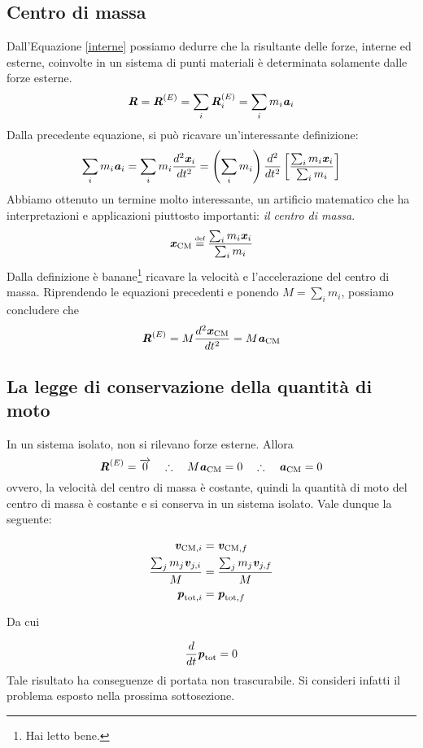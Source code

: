 \subsection{Centro di massa}
Dall'Equazione \ref{interne} possiamo dedurre che la risultante delle
forze, interne ed esterne, coinvolte in un sistema di punti materiali
è determinata solamente dalle forze esterne.
\[ \textbf{\textit{R}} = \textbf{\textit{R}}^{(E)} = \sum_{i} \textbf{\textit{R}}^{(E)}_i = \sum_i m_i\textbf{\textit{a}}_i \]
Dalla precedente equazione, si può ricavare un'interessante definizione:
\[ \sum_i m_i\textbf{\textit{a}}_i = \sum_i m_i \frac{d^2\textbf{\textit{x}}_i}{dt^2} = \left(\sum_i m_i\right) \frac{d^2}{dt^2}\left[ \frac{\sum_i m_i\textbf{\textit{x}}_i}{\sum_i m_i} \right] \]
Abbiamo ottenuto un termine molto interessante, un artificio matematico
che ha interpretazioni e applicazioni piuttosto importanti: \textit{il
centro di massa}.
\begin{align}
    \vecsymb{x}_\text{CM} \eqdef \frac{\sum_i m_i\vecsymb{x}_i}{\sum_i m_i}
\end{align}
Dalla definizione è banane\footnote{Hai letto bene.} ricavare la velocità e l'accelerazione del
centro di massa. Riprendendo le equazioni precedenti e ponendo $M = \sum_i m_i$,
possiamo concludere che
\[ \textbf{\textit{R}}^{(E)} = M\frac{d^2\textbf{\textit{x}}_\text{CM}}{dt^2} = M\textbf{\textit{a}}_\text{CM} \]

\subsection{La legge di conservazione della quantità di moto}
In un sistema isolato, non si rilevano forze esterne. Allora
\[ \textbf{\textit{R}}^{(E)} = \overrightarrow{0} \quad \therefore \quad M\textbf{\textit{a}}_\text{CM} = 0 \quad \therefore \quad \textbf{\textit{a}}_\text{CM} = 0 \]
ovvero, la velocità del centro di massa è costante, quindi la
quantità di moto del centro di massa è costante e si conserva in
un sistema isolato. Vale dunque la seguente:

\begin{align*}
    \textbf{\textit{v}}_{\text{CM}, i} &= \textbf{\textit{v}}_{\text{CM}, f}\\
    \frac{\sum_j m_j\textbf{\textit{v}}_{j,i}}{M} &= \frac{\sum_j m_j\textbf{\textit{v}}_{j,f}}{M}\\
    \textbf{\textit{p}}_{\text{tot}, i} &= \textbf{\textit{p}}_{\text{tot}, f}
\end{align*}

\noindent Da cui

\begin{align}
    \frac{d}{dt}\textbf{\textit{p}}_\text{tot} = 0
\end{align}
Tale risultato ha conseguenze di portata non trascurabile. Si consideri
infatti il problema esposto nella prossima sottosezione.

